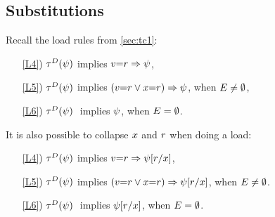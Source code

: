 \showRAfalse

\subsection{Substitutions}
\label{sec:substitutions}

Recall the load rules from \textsection\ref{sec:tc1}: %
\begin{enumerate}
\item[\ref{L4})]
  $\aTr{\bEvs}{\bForm}$ implies $v{=}r\Rightarrow\psi$, 
\item[\ref{L5})]
  $\aTr{\cEvs}{\bForm}$ implies
  $(v{=}r\lor x{=}r)\Rightarrow\psi$, when $E\neq\emptyset$,
\item[\ref{L6})] 
  $\aTr{\dEvs}{\bForm}\;$ implies $\psi$, when $E=\emptyset$.
\end{enumerate}
It is also possible to collapse $x$ and $r$ when doing a load:
\begin{enumerate}
\item[\ref{L4})]
  $\aTr{\bEvs}{\bForm}$ implies $v{=}r\Rightarrow\psi[r/x]$, 
\item[\ref{L5})]
  $\aTr{\cEvs}{\bForm}$ implies
  $(v{=}r\lor x{=}r)\Rightarrow\psi[r/x]$, when $E\neq\emptyset$.
\item[\ref{L6})] 
  $\aTr{\dEvs}{\bForm}\;$ implies $\psi[r/x]$, when $E=\emptyset$.
\end{enumerate}

